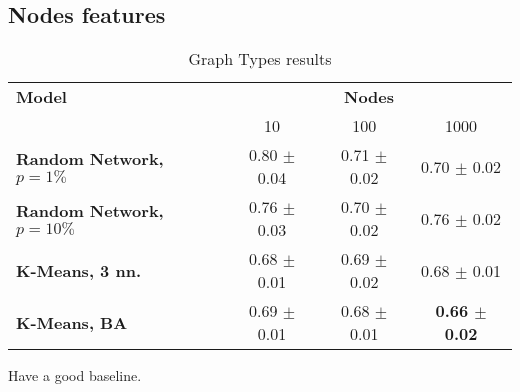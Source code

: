 \documentclass[a4paper,10pt]{article}
\begin{document}
\subsection{Nodes features}

\begin{table*}
  \label{tab:results}
  \centering
  \begin{tabular}{lccc} \toprule
    \textbf{Model}                    & \multicolumn{3}{c}{\textbf{Nodes}}                                                           \\ \cmidrule(lr){2-4}
                                      & 10                                 & 100                    & 1000                           \\ \hline
    \textbf{Random Network, $p=1\%$}  & 0.80  \tiny $\pm$ 0.04             & 0.71  \tiny $\pm$ 0.02 & 0.70 \tiny $\pm$ 0.02          \\
    \textbf{Random Network, $p=10\%$} & 0.76  \tiny $\pm$ 0.03             & 0.70  \tiny $\pm$ 0.02 & 0.76 \tiny $\pm$ 0.02          \\
    \textbf{K-Means, 3 nn.}           & 0.68  \tiny $\pm$ 0.01             & 0.69  \tiny $\pm$ 0.02 & 0.68 \tiny $\pm$ 0.01          \\
    \textbf{K-Means, BA}              & 0.69  \tiny $\pm$ 0.01             & 0.68  \tiny $\pm$ 0.01 & \textbf{0.66 \tiny $\pm$ 0.02} \\

    \bottomrule
  \end{tabular}
  \caption{
    Graph Types results
  }
\end{table*}


Have a good baseline.



\end{document}

